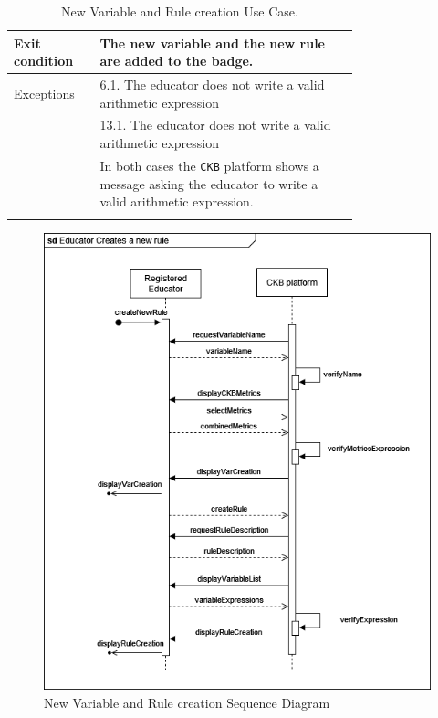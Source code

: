 \begin{center}
\begin{longtable}{lp{0.75\linewidth}}
        \hline
        Exit condition   & The new variable and the new rule are added to the badge.   \\   
        \hline
        Exceptions
        & 6.1. The educator does not write a valid arithmetic expression\\
        & 13.1. The educator does not write a valid arithmetic expression\\
            & In both cases the \verb|CKB| platform shows a message asking the educator to write a valid arithmetic expression.  \\
        \caption{New Variable and Rule creation Use Case.}
        \label{tab: rule_variable_use_case}
    \end{longtable}

    \begin{figure} [H]
        \begin{center}
            \includegraphics[width=0.9\linewidth]{Images/SequenceDiagrams/SD_15.png}
            \caption{New Variable and Rule creation Sequence Diagram}
            \label{fig: rule_variable_seq_diag}
        \end{center}
    \end{figure}
\end{center}




